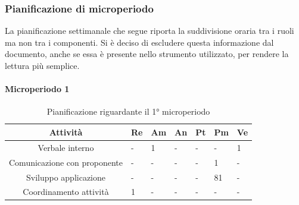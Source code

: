 \subsubsection{Pianificazione di microperiodo}
\indent La pianificazione settimanale che segue riporta la suddivisione oraria tra i ruoli ma non tra i componenti. Si è deciso di escludere questa informazione dal documento, anche se essa è presente nello strumento utilizzato, per rendere la lettura più semplice.

\paragraph{Microperiodo 1}
\begin{table}[H]
	\centering
	\renewcommand{\arraystretch}{1.5}
	\begin{tabular}{|c|p{10mm}|p{10mm}|p{10mm}|p{10mm}|p{10mm}|p{10mm}|}
		\hline
		\rowcolor{lighter-grayer}
		\textbf{Attività}                         & \textbf{Re} & \textbf{Am} & \textbf{An} & \textbf{Pt} & \textbf{Pm} & \textbf{Ve} \\ \hline
		Verbale interno        & - & 1 & - & - & -  & 1 \\ \hline
		Comunicazione con proponente & -           & -           & -           & -           & 1           & -           \\ \hline
		Sviluppo applicazione  & - & - & - & - & 81 & - \\ \hline
		Coordinamento attività & 1 & - & - & - & -  & - \\ \hline
	\end{tabular}
	\caption{ Pianificazione riguardante il 1° microperiodo\\}
\end{table}


